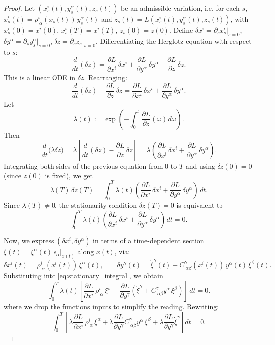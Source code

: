 \documentclass[10pt,a4paper]{amsart}
\begin{document}
\begin{proof}
Let $(x^{i}_s(t),y^{\alpha}_s(t),z_s(t))$ be an admissible variation, i.e.
for each $s$, $\dot x_s^i(t) = \rho^i_{\ \alpha}(x_s(t))\,y_s^\alpha(t)$ and $
\dot z_s(t) = L(x^{i}_s(t),y^{\alpha}_s(t),z_s(t))$, with $x^{i}_s(0)=x^{i}(0)$, $x^{i}_s(T)=x^{i}(T)$, $z_s(0)=z(0)$.
Define $\delta x^i = \partial_s x_s^i|_{s=0}$, 
$\delta y^\alpha=\partial_s y_s^\alpha|_{s=0}$, 
$\delta z = \partial_s z_s|_{s=0}$. Differentiating the Herglotz equation with respect to $s$:
\[
\frac{d}{dt}(\delta z)
= \frac{\partial L}{\partial x^i}\,\delta x^i
+ \frac{\partial L}{\partial y^\alpha}\,\delta y^\alpha
+ \frac{\partial L}{\partial z}\,\delta z.
\]
This is a linear ODE in $\delta z$. Rearranging:
\[
\frac{d}{dt}(\delta z) - \frac{\partial L}{\partial z}\,\delta z
= \frac{\partial L}{\partial x^i}\,\delta x^i
+ \frac{\partial L}{\partial y^\alpha}\,\delta y^\alpha.
\]
Let
\[
\lambda(t) := \exp\!\left(-\int_0^t \frac{\partial L}{\partial z}(\omega)\,d\omega\right).
\]
Then
\[
\frac{d}{dt} \big(\lambda \delta z\big)
= \lambda \left[\frac{d}{dt}(\delta z) - \frac{\partial L}{\partial z}\,\delta z\right]
= \lambda \left(
\frac{\partial L}{\partial x^i}\,\delta x^i
+ \frac{\partial L}{\partial y^\alpha}\,\delta y^\alpha
\right).
\]
Integrating both sides of the previous equation from $0$ to $T$ and using $\delta z(0)=0$ (since $z(0)$ is fixed),
we get
\[
\lambda(T)\,\delta z(T)
= \int_0^T \lambda(t)
\left(
\frac{\partial L}{\partial x^i}\,\delta x^i
+ \frac{\partial L}{\partial y^\alpha}\,\delta y^\alpha
\right) \,dt.
\]
Since $\lambda(T)\neq 0$, the stationarity condition 
$\delta z(T)=0$ is equivalent to
\begin{equation}\label{eq:stationary_integral}
\int_0^T \lambda(t)
\left(
\frac{\partial L}{\partial x^i}\,\delta x^i
+ \frac{\partial L}{\partial y^\alpha}\,\delta y^\alpha
\right) \,dt = 0.
\end{equation}

Now, we express $(\delta x^{i},\delta y^{\alpha})$ in terms of a time-dependent
section $\xi(t) = \xi^\alpha(t)\,e_\alpha|_{x(t)}$ along $x(t)$, via:
\[
\delta x^i(t) = \rho^i_{\ \alpha}(x^{i}(t))\,\xi^\alpha(t),
\qquad
\delta y^\gamma (t)= \dot \xi^\gamma (t) + C^\gamma_{\ \alpha\beta}(x^{i}(t))\,y^\alpha (t) \,\xi^\beta (t).
\]
Substituting into \eqref{eq:stationary_integral}, we obtain
\[
\int_0^T \lambda(t)
\left[
\frac{\partial L}{\partial x^i}\,\rho^i_{\ \alpha}\,\xi^\alpha
+ \frac{\partial L}{\partial y^\gamma}
\left(
\dot \xi^\gamma + C^\gamma_{\ \alpha\beta}y^\alpha\,\xi^\beta
\right)
\right] \,dt = 0.
\]
where we drop the functions inputs to simplify the reading. Rewriting:
\[
\int_0^T \left[
\lambda \frac{\partial L}{\partial x^i}\,\rho^i_{\ \alpha}\,\xi^\alpha
+ \lambda \frac{\partial L}{\partial y^\gamma} C^\gamma_{\ \alpha\beta}y^\alpha\,\xi^\beta
+ \lambda \frac{\partial L}{\partial y^\gamma} \dot \xi^\gamma
\right] dt = 0.
\]


\end{proof}
\end{document}

